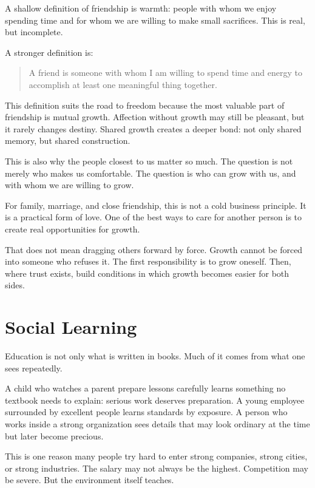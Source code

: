 A shallow definition of friendship is warmth: people with whom we enjoy spending time and for whom we are willing to make small sacrifices. This is real, but incomplete.

A stronger definition is:

\begin{quote}
A friend is someone with whom I am willing to spend time and energy to accomplish at least one meaningful thing together.
\end{quote}

This definition suits the road to freedom because the most valuable part of friendship is mutual growth. Affection without growth may still be pleasant, but it rarely changes destiny. Shared growth creates a deeper bond: not only shared memory, but shared construction.

This is also why the people closest to us matter so much. The question is not merely who makes us comfortable. The question is who can grow with us, and with whom we are willing to grow.

For family, marriage, and close friendship, this is not a cold business principle. It is a practical form of love. One of the best ways to care for another person is to create real opportunities for growth.

That does not mean dragging others forward by force. Growth cannot be forced into someone who refuses it. The first responsibility is to grow oneself. Then, where trust exists, build conditions in which growth becomes easier for both sides.

\section*{Social Learning}

Education is not only what is written in books. Much of it comes from what one sees repeatedly.

A child who watches a parent prepare lessons carefully learns something no textbook needs to explain: serious work deserves preparation. A young employee surrounded by excellent people learns standards by exposure. A person who works inside a strong organization sees details that may look ordinary at the time but later become precious.

This is one reason many people try hard to enter strong companies, strong cities, or strong industries. The salary may not always be the highest. Competition may be severe. But the environment itself teaches.


